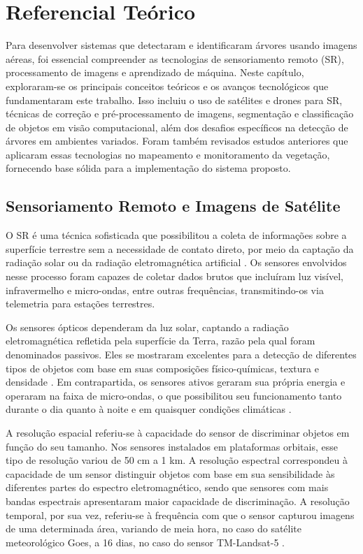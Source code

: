 \documentclass[
    12pt,
    openright,
    oneside,
    a4paper,
    sumario=tradicional,
    english,
    brazil,
    ]{abntex2}
\begin{document}
\chapter{Referencial Teórico}\label{sec:RefTeorico}

Para desenvolver sistemas que detectaram e identificaram árvores usando imagens aéreas, foi essencial compreender as tecnologias de sensoriamento remoto (SR), processamento de imagens e aprendizado de máquina. Neste capítulo, exploraram-se os principais conceitos teóricos e os avanços tecnológicos que fundamentaram este trabalho. Isso incluiu o uso de satélites e drones para SR, técnicas de correção e pré-processamento de imagens, segmentação e classificação de objetos em visão computacional, além dos desafios específicos na detecção de árvores em ambientes variados. Foram também revisados estudos anteriores que aplicaram essas tecnologias no mapeamento e monitoramento da vegetação, fornecendo base sólida para a implementação do sistema proposto.

\section{Sensoriamento Remoto e Imagens de Satélite}

O SR é uma técnica sofisticada que possibilitou a coleta de informações sobre a superfície terrestre sem a necessidade de contato direto, por meio da captação da radiação solar ou da radiação eletromagnética artificial \cite{figueiredo2005conceitos}. Os sensores envolvidos nesse processo foram capazes de coletar dados brutos que incluíram luz visível, infravermelho e micro-ondas, entre outras frequências, transmitindo-os via telemetria para estações terrestres.

Os sensores ópticos dependeram da luz solar, captando a radiação eletromagnética refletida pela superfície da Terra, razão pela qual foram denominados passivos. Eles se mostraram excelentes para a detecção de diferentes tipos de objetos com base em suas composições físico-químicas, textura e densidade \cite{figueiredo2005conceitos}. Em contrapartida, os sensores ativos geraram sua própria energia e operaram na faixa de micro-ondas, o que possibilitou seu funcionamento tanto durante o dia quanto à noite e em quaisquer condições climáticas \cite{florenzano2007iniciaccao}.

A resolução espacial referiu-se à capacidade do sensor de discriminar objetos em função do seu tamanho. Nos sensores instalados em plataformas orbitais, esse tipo de resolução variou de 50 cm a 1 km. A resolução espectral correspondeu à capacidade de um sensor distinguir objetos com base em sua sensibilidade às diferentes partes do espectro eletromagnético, sendo que sensores com mais bandas espectrais apresentaram maior capacidade de discriminação. A resolução temporal, por sua vez, referiu-se à frequência com que o sensor capturou imagens de uma determinada área, variando de meia hora, no caso do satélite meteorológico Goes, a 16 dias, no caso do sensor TM-Landsat-5 \cite{florenzano2007iniciaccao}.
\end{document}

